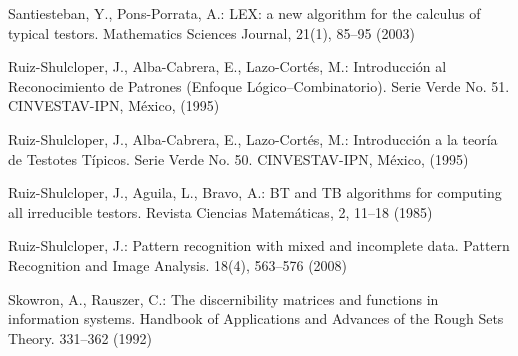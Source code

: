 \documentclass[citeauthoryear]{llncs}
\begin{document}
\begin{thebibliography}{}
	Santiesteban, Y., Pons-Porrata, A.:
	LEX: a new algorithm for the calculus of typical testors. 
	Mathematics Sciences Journal, 21(1), 85--95 (2003)

	Ruiz-Shulcloper, J., Alba-Cabrera, E., Lazo-Cort\'es, M.:
	Introducci\'{o}n al Reconocimiento de Patrones (Enfoque L\'{o}gico--Combinatorio). 
	Serie Verde No. 51. CINVESTAV-IPN, México, (1995)

	Ruiz-Shulcloper, J., Alba-Cabrera, E., Lazo-Cort\'es, M.:
	Introducci\'{o}n a la teor\'ia de Testotes T\'ipicos. 
	Serie Verde No. 50. CINVESTAV-IPN, México, (1995)
	
	Ruiz-Shulcloper, J., Aguila, L., Bravo, A.:
	BT and TB algorithms for computing all irreducible testors. 
	Revista Ciencias Matem\'{a}ticas, 2, 11--18 (1985)

	Ruiz-Shulcloper, J.:
	Pattern recognition with mixed and incomplete data. 
	Pattern Recognition and Image Analysis. 18(4), 563--576 (2008)

	Skowron, A., Rauszer, C.:
	The discernibility matrices and functions in information systems. 
	Handbook of Applications and Advances of the Rough Sets Theory. 331--362  (1992)
	
	
\end{thebibliography}

%
\end{document}
